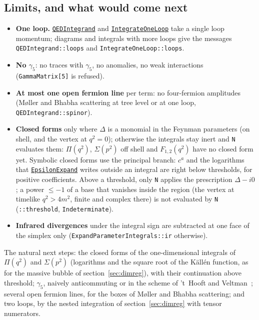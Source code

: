 \documentclass[11pt,a4paper]{article}
\newcommand{\pkg}[1]{\texttt{#1}}
\newcommand{\fnref}[1]{\hyperref[fn:#1]{\pkg{#1}}}
\begin{document}
\subsection{Limits, and what would come next}

\begin{itemize}
\item \textbf{One loop.} \fnref{QEDIntegrand} and \fnref{IntegrateOneLoop} take a single loop momentum; diagrams and
  integrals with more loops give the messages \pkg{QEDIntegrand::loops} and \pkg{IntegrateOneLoop::loops}.
\item \textbf{No $\gamma_5$}: no traces with $\gamma_5$, no anomalies, no weak interactions (\pkg{GammaMatrix[5]} is refused).
\item \textbf{At most one open fermion line} per term: no four-fermion amplitudes (M{\o}ller and Bhabha scattering at tree
  level or at one loop, \pkg{QEDIntegrand::spinor}).
\item \textbf{Closed forms} only where $\Delta$ is a monomial in the Feynman parameters (on shell, and the vertex at $q^2=0$);
  otherwise the integrals stay inert and \pkg{N} evaluates them: $\Pi(q^2)$, $\Sigma(p^2)$ off shell and $F_{1,2}(q^2)$ have no
  closed form yet. Symbolic closed forms use the principal branch: $c^a$ and the logarithms that \fnref{EpsilonExpand} writes
  outside an integral are right below thresholds, for positive coefficients. Above a threshold, only \pkg{N} applies the
  prescription $\Delta-i0$; a power $\le-1$ of a base that vanishes inside the region (the vertex at timelike $q^2>4m^2$, finite and
  complex there) is not evaluated by \pkg{N} (\pkg{::threshold}, \pkg{Indeterminate}).
\item \textbf{Infrared divergences} under the integral sign are subtracted at one face of the simplex only
  (\pkg{ExpandParameterIntegrals::ir} otherwise).
\end{itemize}
The natural next steps: the closed forms of the one-dimensional integrals of $\Pi(q^2)$ and $\Sigma(p^2)$ (logarithms and the
square root of the K\"all\'en function, as for the massive bubble of section~\ref{sec:dimreg}), with their continuation above
threshold; $\gamma_5$, naively anticommuting or in the scheme of 't~Hooft and Veltman~\cite{tHooftVeltman1972}; several open
fermion lines, for the boxes of M{\o}ller and Bhabha scattering; and two loops, by the nested integration of
section~\ref{sec:dimreg} with tensor numerators.

\end{document}
